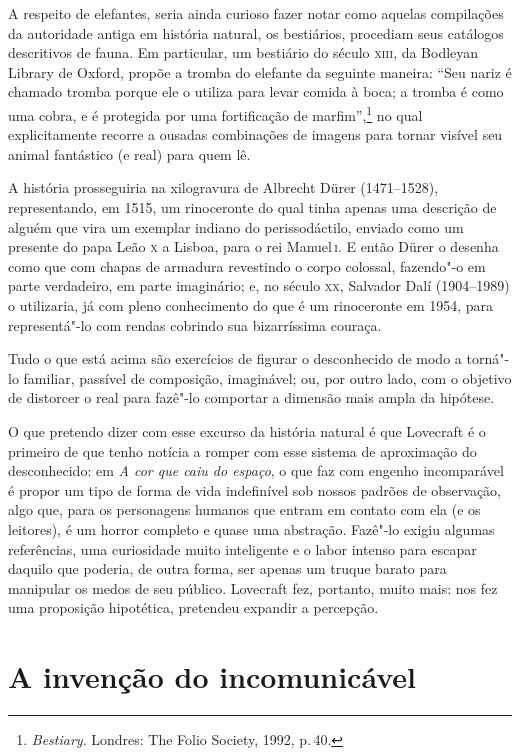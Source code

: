 A respeito de elefantes, seria ainda curioso fazer notar como aquelas
compilações da autoridade antiga em história natural, os bestiários,
procediam seus catálogos descritivos de fauna. Em particular, um
bestiário do século \textsc{xiii}, da Bodleyan Library de Oxford, propõe a tromba
do elefante da seguinte maneira: ``Seu nariz é chamado tromba porque ele
o utiliza para levar comida à boca; a tromba é como uma cobra, e é
protegida por uma fortificação de marfim'',\footnote{\textit{Bestiary}. Londres: The Folio Society, 1992, p.\,40.} no qual explicitamente
recorre a ousadas combinações de imagens para tornar visível seu animal
fantástico (e real) para quem lê.

A história prosseguiria na xilogravura de Albrecht Dürer (1471--1528),
representando, em 1515, um rinoceronte do qual tinha apenas uma
descrição de alguém que vira um exemplar indiano do perissodáctilo,
enviado como um presente do papa Leão \textsc{x} a Lisboa, para o rei Manuel\,\textsc{i}. E
então Dürer o desenha como que com chapas de armadura revestindo o corpo
colossal, fazendo"-o em parte verdadeiro, em parte imaginário; e, no
século \textsc{xx}, Salvador Dalí (1904--1989) o utilizaria, já com pleno
conhecimento do que é um rinoceronte em 1954, para representá"-lo com
rendas cobrindo sua bizarríssima couraça.

Tudo o que está acima são exercícios de figurar o desconhecido de modo a
torná"-lo familiar, passível de composição, imaginável; ou, por outro
lado, com o objetivo de distorcer o real para fazê"-lo comportar a
dimensão mais ampla da hipótese.

O que pretendo dizer com esse excurso da história natural é que
Lovecraft é o primeiro de que tenho notícia a romper com esse sistema de
aproximação do desconhecido: em \textit{A cor que caiu do espaço}, o que faz
com engenho incomparável é propor um tipo de forma de vida indefinível
sob nossos padrões de observação, algo que, para os personagens humanos
que entram em contato com ela (e os leitores), é um horror completo e
quase uma abstração. Fazê"-lo exigiu algumas referências, uma curiosidade
muito inteligente e o labor intenso para escapar daquilo que poderia, de
outra forma, ser apenas um truque barato para manipular os medos de seu
público. Lovecraft fez, portanto, muito mais: nos fez uma proposição
hipotética, pretendeu expandir a percepção.

\section*{A invenção do incomunicável}

